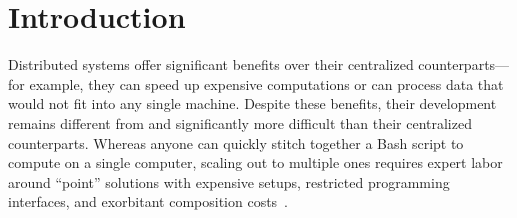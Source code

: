 \documentclass[sigplan,10pt,review,anonymous]{acmart}
\begin{document}




\maketitle


\section{Introduction}
\label{intro}

% 

Distributed systems offer significant benefits over their centralized counterparts---for example, they can speed up expensive computations or can process data that would not fit into any single machine.
Despite these benefits, their development remains different from and significantly more difficult than their centralized counterparts.
Whereas anyone can quickly stitch together a Bash script to compute on a single computer, 
   scaling out to multiple ones requires expert labor around ``point'' solutions with expensive setups, restricted programming interfaces, and exorbitant composition costs~\cite{taurus:14, dios:13, andromeda:15, pywren:17, futuredata:18, nefele:18}.
\end{document}
